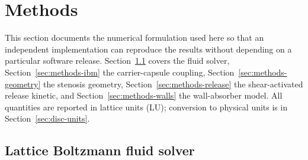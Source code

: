 \documentclass[11pt,a4paper]{article}
\begin{document}
\section{Methods}
\label{sec:methods}

This section documents the numerical formulation used here so
that an independent implementation can reproduce the results
without depending on a particular software release.
Section~\ref{sec:methods-lbm} covers the fluid solver,
Section~\ref{sec:methods-ibm} the carrier-capsule coupling,
Section~\ref{sec:methods-geometry} the stenosis geometry,
Section~\ref{sec:methods-release} the shear-activated release
kinetic, and Section~\ref{sec:methods-walls} the wall-absorber
model. All quantities are reported in lattice units (LU);
conversion to physical units is in Section~\ref{sec:disc-units}.

\subsection{Lattice Boltzmann fluid solver}
\label{sec:methods-lbm}
\end{document}

